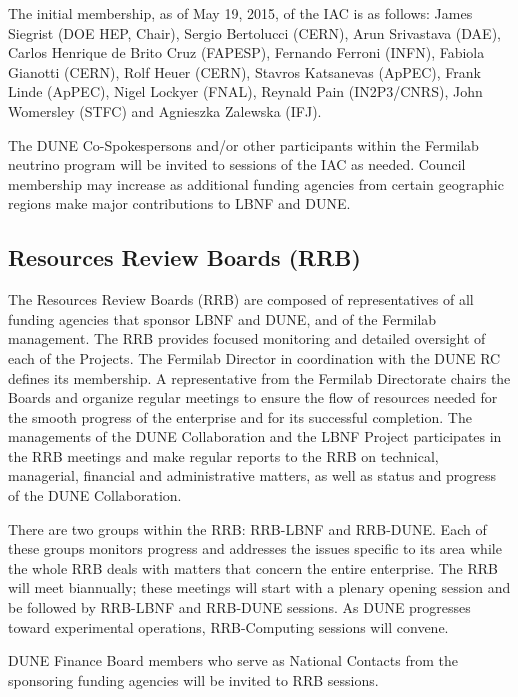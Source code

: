 The initial membership, as of May 19, 2015, of the IAC is as follows:
James Siegrist (DOE HEP, Chair),
Sergio Bertolucci (CERN),
Arun Srivastava (DAE),
Carlos Henrique de Brito Cruz (FAPESP),
Fernando Ferroni (INFN),
Fabiola Gianotti (CERN),
Rolf Heuer (CERN),
Stavros Katsanevas (ApPEC),
Frank Linde (ApPEC),
Nigel Lockyer (FNAL),
Reynald Pain (IN2P3/CNRS),
John Womersley (STFC) and
Agnieszka Zalewska (IFJ).

The DUNE Co-Spokespersons and/or other participants within
the Fermilab neutrino program will be invited to sessions of the IAC as
needed. Council membership may increase as additional funding agencies
from certain geographic regions make major contributions to LBNF and DUNE.

\subsection{Resources Review Boards (RRB)}

The Resources Review Boards (RRB) are composed of representatives of all
funding agencies that sponsor LBNF and DUNE, and of the Fermilab
management. The RRB provides focused monitoring and detailed oversight
of each of the Projects. The Fermilab Director in coordination
with the DUNE RC defines its membership. A representative from the
Fermilab Directorate chairs the Boards and
organize regular meetings to ensure the flow of resources needed
for the smooth progress of the enterprise %
and for its successful completion. %
The managements of the
DUNE Collaboration and the LBNF Project participates in the RRB meetings
and make regular reports to the RRB on technical, managerial,
financial and administrative matters, as well as status and
progress of the DUNE Collaboration.

There are two groups %
within the RRB: RRB-LBNF and RRB-DUNE. Each of
these groups monitors progress and addresses %
 the issues specific to its area %
 while the whole RRB deals with matters
that concern the entire enterprise. %
The RRB will meet
biannually; these meetings %
will start with a plenary
opening session %
and be followed by %
RRB-LBNF and RRB-DUNE sessions. As DUNE progresses toward
experimental operations, RRB-Computing sessions will convene.

DUNE Finance Board members who serve as National Contacts from the %
sponsoring funding agencies will be invited to RRB sessions.

